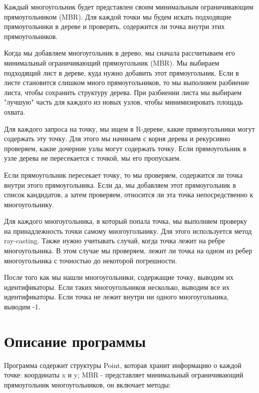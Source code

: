 \documentclass[12pt]{article}
\begin{document}
Каждый многоугольник будет представлен своим минимальным ограничивающим прямоугольником (MBR). Для каждой точки мы будем искать подходящие прямоугольники в дереве и проверять, содержится ли точка внутри этих прямоугольников.

Когда мы добавляем многоугольник в дерево, мы сначала рассчитываем его минимальный ограничивающий прямоугольник (MBR). Мы выбираем подходящий лист в дереве, куда нужно добавить этот прямоугольник. Если в листе становится слишком много прямоугольников, то мы выполняем разбиение листа, чтобы сохранить структуру дерева. При разбиении листа мы выбираем "лучшую" часть для каждого из новых узлов, чтобы минимизировать площадь охвата.

Для каждого запроса на точку, мы ищем в R-дереве, какие прямоугольники могут содержать эту точку. Для этого мы начинаем с корня дерева и рекурсивно проверяем, какие дочерние узлы могут содержать точку. Если прямоугольник в узле дерева не пересекается с точкой, мы его пропускаем.

Если прямоугольник пересекает точку, то мы проверяем, содержится ли точка внутри этого прямоугольника. Если да, мы добавляем этот прямоугольник в список кандидатов, а затем проверяем, относится ли эта точка непосредственно к многоугольнику.

Для каждого многоугольника, в который попала точка, мы выполняем проверку на принадлежность точки самому многоугольнику. Для этого используется метод ray-casting. Также нужно учитывать случай, когда точка лежит на ребре многоугольника. В этом случае мы проверяем, лежит ли точка на одном из ребер многоугольника с точностью до некоторой погрешности.

После того как мы нашли многоугольники, содержащие точку, выводим их идентификаторы. Если таких многоугольников несколько, выводим все их идентификаторы. Если точка не лежит внутри ни одного многоугольника, выводим -1.

\newpage
\section*{Описание программы}

Программа содержит структуры Point, которая хранит информацию о каждой точке: координаты x и y; MBR - представляет минимальный ограничивающий прямоугольник многоугольников, он включает методы:
\end{document}
